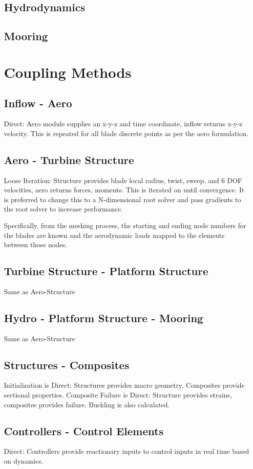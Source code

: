 \documentclass[11pt]{article}
\begin{document}
\subsection{Hydrodynamics}
\subsection{Mooring}

\section{Coupling Methods}

\subsection{Inflow - Aero}
Direct: Aero module supplies an x-y-z and time coordinate, inflow returns x-y-z velocity.  This is repeated for all blade discrete points as per the aero formulation.
\subsection{Aero - Turbine Structure}
Loose Iteration: Structure provides blade local radius, twist, sweep, and 6 DOF velocities, aero returns forces, moments. This is iterated on until convergence.  It is preferred to change this to a N-dimensional root solver and pass gradients to the root solver to increase performance.

Specifically, from the meshing process, the starting and ending node numbers for the blades are known and the aerodynamic loads mapped to the elements between those nodes.

\subsection{Turbine Structure - Platform Structure}
Same as Aero-Structure
\subsection{Hydro - Platform Structure - Mooring}
Same as Aero-Structure
\subsection{Structures - Composites}
Initialization is Direct: Structures provides macro geometry, Composites provide sectional properties. Composite Failure is Direct: Structure provides strains, composites provides failure.  Buckling is also calculated.
\subsection{Controllers - Control Elements}
Direct: Controllers provide reactionary inputs to control inputs in real time based on dynamics.


\end{document}
